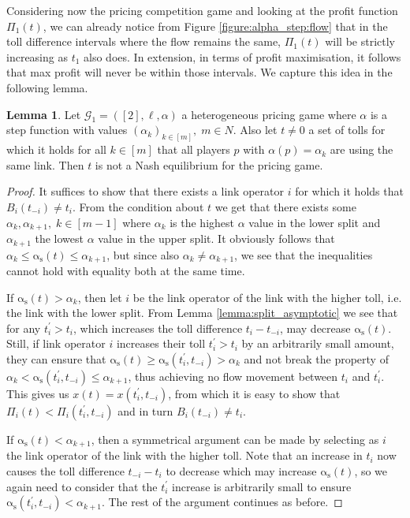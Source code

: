 \documentclass[10pt,a4paper]{book}
\newcommand{\as}{\mathrm{\alpha_s}}
\newcommand{\Gm}{\mathcal{G}}
\theoremstyle{definition}
\newtheorem{lemma}[definition]{Lemma}
\theoremstyle{comment}
\begin{document}
Considering now the pricing competition game and looking at the profit function $\Pi_1(t)$, we can already notice from Figure \ref{figure:alpha_step:flow} that in the toll difference intervals where the flow remains the same, $\Pi_1(t)$ will be strictly increasing as $t_1$ also does.
In extension, in terms of profit maximisation, it follows that max profit will never be within those intervals.
We capture this idea in the following lemma.

\begin{lemma}
	\label{lemma:alpha_step_gaps}
	Let $\Gm_1 = ([2], \ell, \alpha)$ a heterogeneous pricing game where $\alpha$ is a step function with values $(\alpha_k)_{k \in [m]}, \; m \in N$.
	Also let $t \ne 0$ a set of tolls for which it holds for all $k \in [m]$ that all players $p$ with $\alpha(p) = \alpha_k$ are using the same link.
	Then $t$ is not a Nash equilibrium for the pricing game.
\end{lemma}

\begin{proof}
	It suffices to show that there exists a link operator $i$ for which it holds that $B_i(t_{-i}) \ne t_i$.
	From the condition about $t$ we get that there exists some $\alpha_k, \alpha_{k + 1}, \; k \in [m - 1]$ where $\alpha_k$ is the highest $\alpha$ value in the lower split and $\alpha_{k + 1}$ the lowest $\alpha$ value in the upper split.
	It obviously follows that $\alpha_k \le \as(t) \le \alpha_{k + 1}$, but since also $\alpha_k \ne \alpha_{k + 1}$, we see that the inequalities cannot hold with equality both at the same time.
	
	If $\as(t) > \alpha_k$, then let $i$ be the link operator of the link with the higher toll, i.e. the link with the lower split.
	From Lemma \ref{lemma:split_asymptotic} we see that for any $t_i^\prime > t_i$, which increases the toll difference $t_i - t_{-i}$, may decrease $\as(t)$.
	Still, if link operator $i$ increases their toll $t_i^\prime > t_i$ by an arbitrarily small amount, they can ensure that $\as(t) \ge \as(t_i^\prime, t_{-i}) > \alpha_k$ and not break the property of $\alpha_k < \as(t_i^\prime, t_{-i}) \le \alpha_{k + 1}$, thus achieving no flow movement between $t_i$ and $t_i^\prime$.
	This gives us $x(t) = x(t_i^\prime, t_{-i})$, from which it is easy to show that $\Pi_i(t) < \Pi_i(t_i^\prime, t_{-i})$ and in turn $B_i(t_{-i}) \ne t_i$.
	
	If $\as(t) < \alpha_{k + 1}$, then a symmetrical argument can be made by selecting as $i$ the link operator of the link with the higher toll.
	Note that an increase in $t_i$ now causes the toll difference $t_{-i} - t_i$ to decrease which may increase $\as(t)$, so we again need to consider that the $t_i^\prime$ increase is arbitrarily small to ensure $\as(t_i^\prime, t_{-i}) < \alpha_{k + 1}$.
	The rest of the argument continues as before.
\end{proof}
\end{document}
